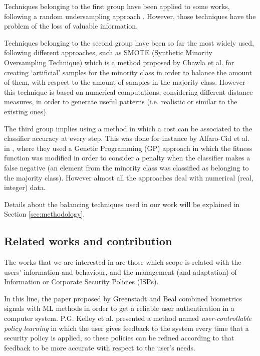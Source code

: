 \documentclass{llncs}
\begin{document}
Techniques belonging to the first group have been applied to some works, following a random undersampling approach \cite{random_undersampling_08}. However, those techniques have the problem of the loss of valuable information. 

Techniques belonging to the second  group have been so far the most widely used, following different approaches, such as SMOTE (Synthetic Minority Oversampling Technique) \cite{smote_02} which is a method proposed by Chawla et al. for creating `artificial' samples for the minority class in order to balance the amount of them, with respect to the amount of samples in the majority class. However this technique is based on numerical computations, considering  different distance measures, in order to generate useful patterns  (i.e. realistic or similar to the existing ones).

The third group implies using a method in which a cost can be associated to the classifier accuracy at every step. This was done for instance by Alfaro-Cid et al. in \cite{cost_adjustment_07}, where they used a Genetic Programming (GP) approach in which the fitness function was modified in order to consider a penalty when the classifier makes a false negative (an element from the minority class was classified as belonging to the majority class).
However almost all the approaches deal with numerical (real, integer) data.

Details about the balancing techniques used in our work will be explained in Section \ref{sec:methodology}. 

%
\subsection{Related works and contribution}
\label{subsec:relatedworks}

The works that we are interested in are those which scope is related with the users' information and behaviour, and the management (and adaptation) of Information or Corporate Security Policies (ISPs).

In this line, the paper proposed by Greenstadt and Beal \cite{cognitive_security_08} combined biometrics signals with ML methods in order to get a reliable user authentication in a computer system. P.G. Kelley et al. \cite{user-controllable_learning_08} presented a method named \textit{user-controllable policy learning} in which the user gives feedback to the system every time that a security policy is applied, so these policies can be refined according to that feedback to be more accurate with respect to the user's needs. 
\end{document}
